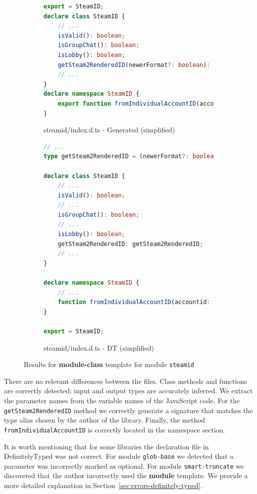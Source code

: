 \documentclass[sigplan,screen]{acmart}
\newcommand{\secref}[1]{Section~\ref{#1}}
\begin{document}
\begin{figure}[tp]
  \centering
  \begin{subfigure}[t]{0.48\linewidth}
    \begin{lstlisting}[language=TypeScript,numbers=none]
export = SteamID;
declare class SteamID {
    // ...
    isValid(): boolean;
    isGroupChat(): boolean;
    isLobby(): boolean;
    getSteam2RenderedID(newerFormat?: boolean): string;
    // ...
}
declare namespace SteamID {
    export function fromIndividualAccountID(accountid: string | number): SteamID;
}  
    \end{lstlisting}
    \caption{steamid/index.d.ts - Generated (simplified)}
  \end{subfigure}
  \hfill
  \begin{subfigure}[t]{0.48\linewidth}
    \begin{lstlisting}[language=TypeScript,numbers=none]
// ...
type getSteam2RenderedID = (newerFormat?: boolean) => string;

declare class SteamID {
    // ...
    isValid(): boolean;
    // ...
    isGroupChat(): boolean;
    // ...
    isLobby(): boolean;
    getSteam2RenderedID: getSteam2RenderedID;
    // ...
}

declare namespace SteamID {
    // ...
    function fromIndividualAccountID(accountid: number | string): SteamID;
}

export = SteamID;
    \end{lstlisting}
    \caption{steamid/index.d.ts - DT (simplified)}
  \end{subfigure}

  \caption{Results for \textbf{module-class} template for module \texttt{steamid}}
  \label{fig:experiments-results-module-steamid}
\end{figure}

There are no relevant differences between the files. 
Class methods and functions are correctly detected; input and output types are
accurately inferred. We extract the parameter names from the variable names of the JavaScript
code. For the \texttt{getSteam2RenderedID} method we correctly generate a signature
that matches the type alias chosen by the author of the library. Finally, the method \\
\texttt{fromIndividualAccountID} is correctly located in the namespace section.

It is worth mentioning that for some libraries the declaration file in DefinitelyTyped was
not correct. For module \texttt{glob-base} we detected that a parameter was
incorrectly marked as optional. For module \texttt{smart-truncate} we discovered that the author
incorrectly used the \textbf{module} template.
We provide a more detailed explanation in \secref{sec:errors-definitely-typed}.
\end{document}
